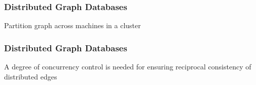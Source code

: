 \begin{frame}
  \frametitle{Distributed Graph Databases}
  \centering
  Partition graph across machines in a cluster
  

\end{frame}

\begin{frame}
  \frametitle{Distributed Graph Databases}
\begin{center}
  A degree of concurrency control is needed for ensuring reciprocal consistency of distributed edges
  \end{center}
\end{frame}